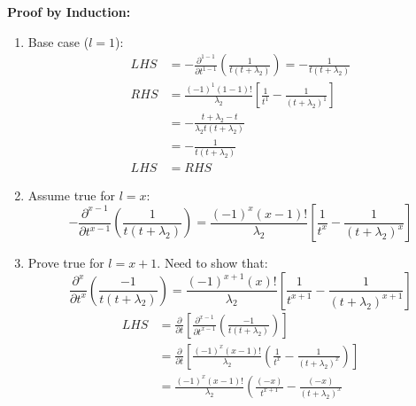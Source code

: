 \begin{itemize}
    \textbf{Proof by Induction:}
    \begin{enumerate}
        \item Base case (\(l=1\)):
        \begin{equation*}
            \begin{split}
                LHS &= -\frac{\partial^{1-1}}{\partial t^{1-1}} 
                \left( \frac{1}{t(t + \lambda_2)}\right) = 
                - \frac{1}{t(t + \lambda_2)} \\
                RHS &= \frac{(-1)^{1} (1-1)!}{\lambda_2}
                \left[\frac{1}{t^1} - \frac{1}{(t + \lambda_2)^1}\right] \\
                &= - \frac{t + \lambda_2 - t}{\lambda_2 t (t + \lambda_2)} \\
                &= - \frac{1}{t (t + \lambda_2)} \\
                LHS &= RHS
            \end{split}
        \end{equation*}
        \item Assume true for \(l = x\):
        \begin{equation*}
            -\frac{\partial^{x-1}}{\partial t^{x-1}} 
            \left( \frac{1}{t(t + \lambda_2)}\right) = 
            \frac{(-1)^{x} (x-1)!}{\lambda_2}
            \left[\frac{1}{t^x} - \frac{1}{(t + \lambda_2)^x}\right]
        \end{equation*}
        \item Prove true for \(l = x + 1\). Need to show that:
        \[ 
            \frac{\partial^x}{\partial t ^ x} 
            \left( \frac{-1}{t (t + \lambda_2)} \right) = 
            \frac{(-1)^{x + 1} (x)!}{\lambda_2}
            \left[ \frac{1}{t^{x+1}}-\frac{1}{(t + \lambda_2)^{x+1}} \right] 
        \]
        \begin{equation*}
            \begin{split}
                LHS &= \frac{\partial}{\partial t}
                \left[ \frac{\partial^{x-1}}{\partial t ^ {x-1}} 
                \left( \frac{-1}{t (t + \lambda_2)} \right) \right] \\
                &= \frac{\partial}{\partial t} \left[
                    \frac{(-1)^x (x-1)!}{\lambda_2} \left(
                        \frac{1}{t^x} - \frac{1}{(t + \lambda_2)^x}
                    \right)
                \right] \\
                &= \frac{(-1)^x (x-1)!}{\lambda_2} \left(
                    \frac{(-x)}{t^{x+1}} - \frac{(-x)}{(t + \lambda_2)^x}

\end{split}
\end{equation*}
\end{enumerate}
\end{itemize}
